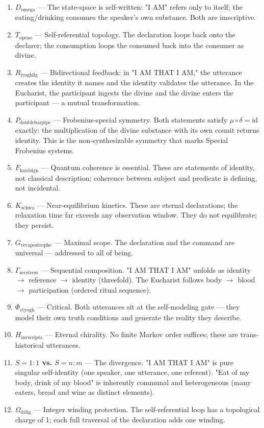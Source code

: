 \documentclass[12pt,a4paper]{article}
\begin{document}
\begin{enumerate}
    \item \textbf{$D_{\text{omega}}$} --- The state-space is self-written: "I AM" refers only to itself; the eating/drinking consumes the speaker's own substance. Both are imscriptive.
    \item \textbf{$T_{\text{openo}}$} --- Self-referential topology. The declaration loops back onto the declarer; the consumption loops the consumed back into the consumer as divine.
    \item \textbf{$R_{\text{lyoghlig}}$} --- Bidirectional feedback: in "I AM THAT I AM," the utterance creates the identity it names and the identity validates the utterance. In the Eucharist, the participant ingests the divine and the divine enters the participant --- a mutual transformation.
    \item \textbf{$P_{\text{doublebarpipe}}$} --- Frobenius-special symmetry. Both statements satisfy $\mu \circ \delta = \text{id}$ exactly: the multiplication of the divine substance with its own counit returns identity. This is the non-synthesizable symmetry that marks Special Frobenius systems.
    \item \textbf{$F_{\text{hardsign}}$} --- Quantum coherence is essential. These are statements of identity, not classical description; coherence between subject and predicate is defining, not incidental.
    \item \textbf{$K_{\text{schwa}}$} --- Near-equilibrium kinetics. These are eternal declarations; the relaxation time far exceeds any observation window. They do not equilibrate; they persist.
    \item \textbf{$G_{\text{revapostrophe}}$} --- Maximal scope. The declaration and the command are universal --- addressed to all of being.
    \item \textbf{$\Gamma_{\text{secstress}}$} --- Sequential composition. "I AM THAT I AM" unfolds as identity $\rightarrow$ reference $\rightarrow$ identity (threefold). The Eucharist follows body $\rightarrow$ blood$\rightarrow$ participation (ordered ritual sequence).
    \item \textbf{$\Phi_{\text{ctyogh}}$} --- Critical. Both utterances sit at the self-modeling gate --- they model their own truth conditions and generate the reality they describe.
    \item \textbf{$H_{\text{invscripta}}$} --- Eternal chirality. No finite Markov order suffices; these are trans-historical utterances.
    \item \textbf{$S = 1{:}1$ vs. $S = n{:}m$} --- The divergence. "I AM THAT I AM" is pure singular self-identity (one speaker, one utterance, one referent). "Eat of my body, drink of my blood" is inherently communal and heterogeneous (many eaters, bread and wine as distinct elements).
    \item \textbf{$\Omega_{\text{dzlig}}$} --- Integer winding protection. The self-referential loop has a topological charge of 1; each full traversal of the declaration adds one winding.
\end{enumerate}
\end{document}
